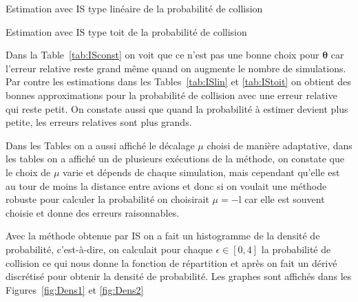 \documentclass[a4paper, 12pt,twoside]{article}
\numberwithin{equation}{subsection}
\begin{document}
	\begin{table}[htbp]
		\begin{center}
		\end{center}
		\caption{Estimation avec IS type linéaire de la probabilité de collision}
		\label{tab:ISlin}
	\end{table}
	
	\begin{table}[htbp]
		\begin{center}
		\end{center}
		\caption{Estimation avec IS type toit de la probabilité de collision}
		\label{tab:IStoit}
	\end{table}
	
	Dans la Table~\ref{tab:ISconst} on voit que ce n'est pas une bonne choix pour $\boldsymbol \theta$ car l'erreur relative reste grand même quand on augmente le nombre de simulations. Par contre les estimations dans les Tables~\ref{tab:ISlin} et \ref{tab:IStoit} on obtient des bonnes approximations pour la probabilité de collision avec une erreur relative qui reste petit. On constate aussi que quand la probabilité à estimer devient plus petite, les erreurs relatives sont plus grands.
	
	Dans les Tables on a aussi affiché le décalage $\mu$ choisi de manière adaptative, dans les tables on a affiché un de plusieurs exécutions de la méthode, on constate que le choix de $\mu$ varie et dépends de chaque simulation, mais cependant qu'elle est au tour de moins la distance entre avions et donc si on voulait une méthode robuste pour calculer la probabilité on choisirait $\mu=-\mathrm{l}$ car elle est souvent choisie et donne des erreurs raisonnables.
	
	Avec la méthode obtenue par IS on a fait un histogramme de la densité de probabilité, c'est-à-dire, on calculait pour chaque $\epsilon \in [0,4]$ la probabilité de collision ce qui nous donne la fonction de répartition et après on fait un dérivé discrétisé pour obtenir la densité de probabilité. Les graphes sont affichés dans les Figures~\ref{fig:Dens1} et \ref{fig:Dens2}
	
\end{document}
